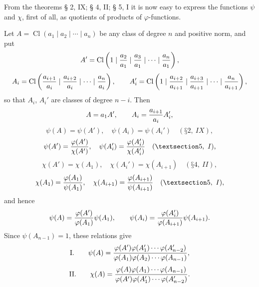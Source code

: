 \documentclass[11pt,a4paper]{article}
\newcommand{\Cl}{\operatorname{Cl}}
\begin{document}
From the theorems § 2, IX; § 4, II; § 5, I it is now easy to express the functions $\psi$ and $\chi$, first of all, as quotients of products of $\varphi$-functions.

Let $A=\Cl(a_1\mid a_2\mid\cdots\mid a_n)$ be any class of degree $n$ and positive norm, and put
\[
 A'=\Cl\left(1\mid {a_2\over a_1}\mid {a_3\over a_1}\mid\cdots\mid {a_n\over a_1}\right),
\]
\[
 A_i=\Cl\left({a_{i+1}\over a_i}\mid {a_{i+2}\over a_i}\mid\cdots\mid {a_n\over a_i}\right),
\qquad
 A_i'=\Cl\left(1\mid {a_{i+2}\over a_{i+1}}\mid {a_{i+3}\over a_{i+1}}\mid\cdots\mid {a_n\over a_{i+1}}\right),
\]
so that $A_i$, $A_i'$ are classes of degree $n-i$. Then
\[
 A=a_1A',\qquad A_i={a_{i+1}\over a_i}A_i',
\]
\[
 \psi(A)=\psi(A'),\quad \psi(A_i)=\psi(A_i')\quad (§ 2,\ IX),
\]
\[
 \psi(A')={\varphi(A')\over\chi(A')},\quad
 \psi(A_i')={\varphi(A_i')\over\chi(A_i')}\quad (§ 5,\ I),
\]
\[
 \chi(A')=\chi(A_1),\quad \chi(A_i')=\chi(A_{i+1})\quad (§ 4,\ II),
\]
\[
 \chi(A_1)={\varphi(A_1)\over\psi(A_1)},\quad
 \chi(A_{i+1})={\varphi(A_{i+1})\over\psi(A_{i+1})}\quad (§ 5,\ I),
\]
and hence
\[
 \psi(A)={\varphi(A')\over\varphi(A_1)}\psi(A_1),
 \qquad
 \psi(A_i)={\varphi(A_i')\over\varphi(A_{i+1})}\psi(A_{i+1}).
\]
Since $\psi(A_{n-1})=1$, these relations give
\[
\text{I.}\qquad
 \psi(A)={\varphi(A')\varphi(A_1')\cdots\varphi(A_{n-2}')
 \over
 \varphi(A_1)\varphi(A_2)\cdots\varphi(A_{n-1})},
\]
\[
\text{II.}\qquad
 \chi(A)={\varphi(A)\varphi(A_1)\cdots\varphi(A_{n-1})
 \over
 \varphi(A')\varphi(A_1')\cdots\varphi(A_{n-2}')}.
\]
\end{document}
